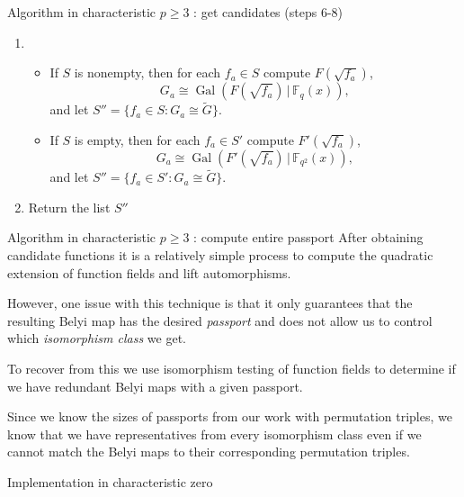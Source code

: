 \documentclass[xcolor=dvipsnames]{beamer}
\theoremstyle{plain}
\newcommand{\wt}[1]{\widetilde{#1}}
\newcommand{\FF}{\mathbb{F}}
\DeclareMathOperator{\Gal}{Gal}
\begin{document}
{\begin{frame}{Algorithm in characteristic $p\geq 3$ : get candidates (steps 6-8)}
\begin{enumerate}
          saved in Step 5e.
          \pause
        \item[7.]
          \begin{itemize}
            \item
              If $S$ is nonempty,
              then
              for each $f_a\in S$
              compute
              $F(\sqrt{f_a})$,
              \[
                G_a\cong\Gal(F(\sqrt{f_a})\,|\,\FF_q(x)),
              \]
              and let
              $S''=
              \{f_a\in S:G_a\cong\wt{G}\}$.
              \pause
            \item
              If $S$ is empty,
              then
              for each $f_a\in S'$
              compute
              $F'(\sqrt{f_a})$,
              \[
                G_a\cong\Gal(F'(\sqrt{f_a})\,|\,\FF_{q^2}(x)),
              \]
              and let
              $S''=
              \{f_a\in S':G_a\cong\wt{G}\}$.
              \pause
          \end{itemize}
        \item[8.]
          Return the list $S''$
      \end{enumerate}
    \end{frame}
    \begin{frame}{Algorithm in characteristic $p\geq 3$ : compute entire passport}
      After obtaining candidate functions it is a relatively
      simple process to compute the quadratic extension
      of function fields and lift automorphisms.
      \pause\par
      However, one issue with this technique
      is that it only guarantees that the
      resulting Belyi map has the desired
      \emph{passport} and does not allow us
      to control which \emph{isomorphism class} we get.
      \pause\par
      To recover from this we use isomorphism testing
      of function fields to determine if we have
      redundant Belyi maps with a given passport.
      \pause\par
      Since we know the sizes of passports from our
      work with permutation triples,
      we know that we have representatives from
      every isomorphism class
      even if we cannot match the Belyi maps
      to their corresponding permutation triples.
    \end{frame}
    \begin{frame}{Implementation in characteristic zero}

\end{frame}}
\end{document}
